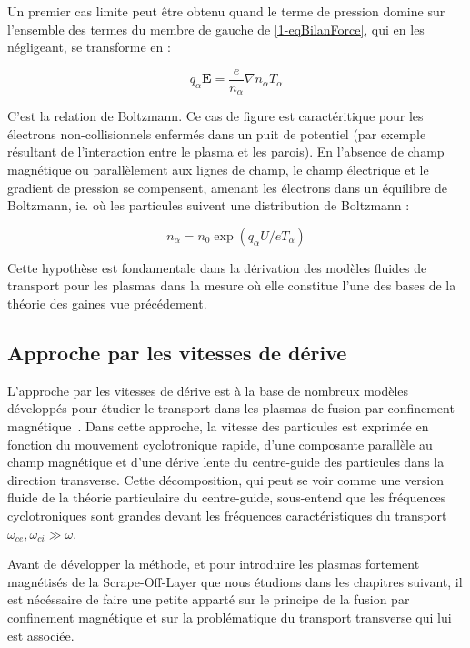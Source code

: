 \begin{refsection}
Un premier cas limite peut être obtenu quand le terme de pression domine
sur l'ensemble des termes du membre de gauche de \eqref{1-eqBilanForce}, qui en
les négligeant, se transforme en :

\begin{equation}
\label{1-equilibreBoltzman}
q_\alpha\mathbf
E =\frac{e}{n_\alpha}\nabla n_\alpha T_\alpha
\end{equation}

C'est la relation de Boltzmann. Ce cas de figure est caractéritique pour les
électrons non-collisionnels enfermés dans un puit de potentiel (par exemple résultant de
l'interaction entre le plasma et les parois). En l'absence de champ magnétique
ou parallèlement aux lignes de champ, le champ électrique et le gradient de
pression se compensent, amenant les électrons dans un équilibre de Boltzmann,
ie. où les particules suivent une distribution de Boltzmann :

\begin{equation}
\label{1-profilBoltzman}
n_\alpha=n_0\exp(q_\alpha U/eT_\alpha)
\end{equation}

Cette hypothèse est fondamentale dans la dérivation des modèles fluides de
transport pour les plasmas dans la mesure où elle constitue l'une des bases de
la théorie des gaines vue précédement. 

\subsection{Approche par les vitesses de dérive}

L'approche par les vitesses de dérive est à la base de nombreux modèles
développés pour étudier le transport dans les plasmas de fusion par
confinement magnétique~\parencite{Garcia,Bisai,Tamain}. Dans cette approche, la
vitesse des particules est exprimée en fonction du mouvement cyclotronique rapide, d'une composante
parallèle au champ magnétique et d'une dérive lente du centre-guide des particules dans
la direction transverse. Cette décomposition, qui peut se voir comme une
version fluide de la théorie particulaire du centre-guide, sous-entend que les
fréquences cyclotroniques sont grandes devant les fréquences caractéristiques du transport
 $\omega_{ce},\omega_{ci}\gg\omega$. 
 
 Avant de développer la méthode, et pour introduire les plasmas
 fortement magnétisés de la Scrape-Off-Layer que nous étudions dans les
 chapitres suivant, il est nécéssaire de faire une petite apparté sur le
 principe de la fusion par confinement magnétique et sur la problématique du
 transport transverse qui lui est associée.


\end{refsection}
